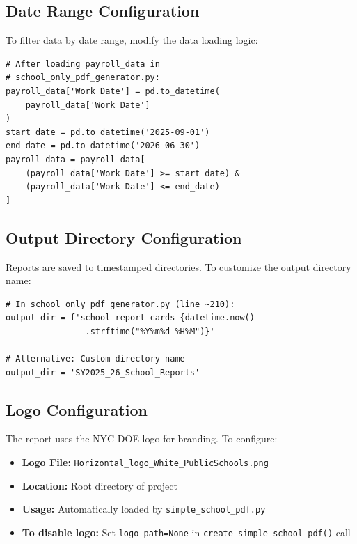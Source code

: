 \documentclass[12pt,letterpaper]{article}
\begin{document}
\subsection{Date Range Configuration}

To filter data by date range, modify the data loading logic:

\begin{tcolorbox}[colback=gray!5!white,colframe=graytext,title=\textbf{Example: Filter Payroll Data by Date},breakable]
\begin{Verbatim}[fontsize=\small]
# After loading payroll_data in 
# school_only_pdf_generator.py:
payroll_data['Work Date'] = pd.to_datetime(
    payroll_data['Work Date']
)
start_date = pd.to_datetime('2025-09-01')
end_date = pd.to_datetime('2026-06-30')
payroll_data = payroll_data[
    (payroll_data['Work Date'] >= start_date) & 
    (payroll_data['Work Date'] <= end_date)
]
\end{Verbatim}
\end{tcolorbox}

\subsection{Output Directory Configuration}

Reports are saved to timestamped directories. To customize the output directory name:

\begin{tcolorbox}[colback=gray!5!white,colframe=graytext,title=\textbf{Output Directory Example},breakable]
\begin{Verbatim}[fontsize=\small]
# In school_only_pdf_generator.py (line ~210):
output_dir = f'school_report_cards_{datetime.now()
                .strftime("%Y%m%d_%H%M")}'

# Alternative: Custom directory name
output_dir = 'SY2025_26_School_Reports'
\end{Verbatim}
\end{tcolorbox}

\subsection{Logo Configuration}

The report uses the NYC DOE logo for branding. To configure:

\begin{itemize}[leftmargin=*]
    \item \textbf{Logo File:} \texttt{Horizontal\_logo\_White\_PublicSchools.png}
    \item \textbf{Location:} Root directory of project
    \item \textbf{Usage:} Automatically loaded by \texttt{simple\_school\_pdf.py}
    \item \textbf{To disable logo:} Set \texttt{logo\_path=None} in \texttt{create\_simple\_school\_pdf()} call
\end{itemize}
\end{document}
